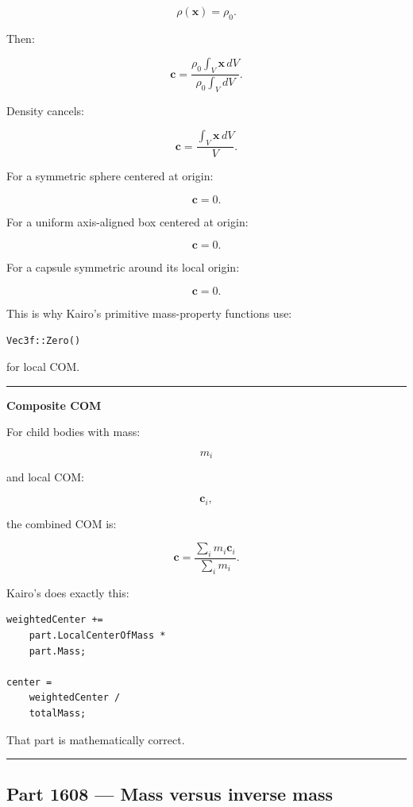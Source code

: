 \[
\rho(\mathbf{x})=\rho_0.
\]

Then:

\[
\mathbf{c}
=
\frac{
\rho_0\int_V\mathbf{x}\,dV
}{
\rho_0\int_VdV
}.
\]

Density cancels:

\[
\mathbf{c}
=
\frac{
\int_V\mathbf{x}\,dV
}{
V
}.
\]

For a symmetric sphere centered at origin:

\[
\mathbf{c}=0.
\]

For a uniform axis-aligned box centered at origin:

\[
\mathbf{c}=0.
\]

For a capsule symmetric around its local origin:

\[
\mathbf{c}=0.
\]

This is why Kairo's primitive mass-property functions use:

\begin{verbatim}
Vec3f::Zero()
\end{verbatim}

for local COM.

\begin{center}\rule{0.5\linewidth}{0.5pt}\end{center}

\textbf{Composite COM}

For child bodies with mass:

\[
m_i
\]

and local COM:

\[
\mathbf{c}_i,
\]

the combined COM is:

\[
\boxed{
\mathbf{c}
=
\frac{
\sum_i m_i\mathbf{c}_i
}{
\sum_i m_i
}.
}
\]

Kairo's  does exactly this:

\begin{verbatim}
weightedCenter +=
    part.LocalCenterOfMass *
    part.Mass;

center =
    weightedCenter /
    totalMass;
\end{verbatim}

That part is mathematically correct.

\begin{center}\rule{0.5\linewidth}{0.5pt}\end{center}

\subsection{Part 1608 --- Mass versus inverse mass}\label{06-engine-ii-ch034-part-1608-mass-versus-inverse-mass}

